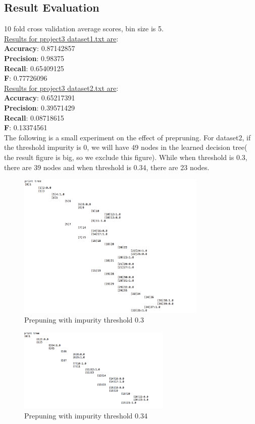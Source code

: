 \documentclass[paper=letter, fontsize=11pt]{article}
\numberwithin{equation}{section}		%
\numberwithin{figure}{section}			%
\numberwithin{table}{section}				%
\begin{document}
\subsection{Result Evaluation}
10 fold  cross validation average scores, bin size is 5.
\\
\noindent \underline{ Results for project3 dataset1.txt are}: \\ 
\textbf{Accuracy}: 0.87142857\\
\textbf{Precision}: 0.98375\\
\textbf{Recall}: 0.65409125\\
\textbf{F}: 0.77726096\\

\noindent \underline{ Results for project3 dataset2.txt are}: \\ 
\textbf{Accuracy}: 0.65217391\\
\textbf{Precision}: 0.39571429\\
\textbf{Recall}: 0.08718615\\
\textbf{F}: 0.13374561\\

The following is a small experiment on the effect of prepruning. For dataset2, if the threshold impurity is 0, we will have 49 nodes in the learned decision tree( the result  figure is big, so we exclude this figure). While when threshold is 0.3, there are  39 nodes and when threshold is 0.34, there are 23 nodes.
\begin{figure}[h]
  \centering
  \includegraphics[width=1\linewidth,height=7cm]{dataset2_threshold_3.png}
  \caption{Prepuning with impurity threshold 0.3}
\end{figure}

\begin{figure}[h]
  \centering
  \includegraphics[width=0.8\linewidth,height=4cm]{dataset2_threshold_34.png}
  \caption{Prepuning with impurity threshold 0.34}
\end{figure}
\end{document}
